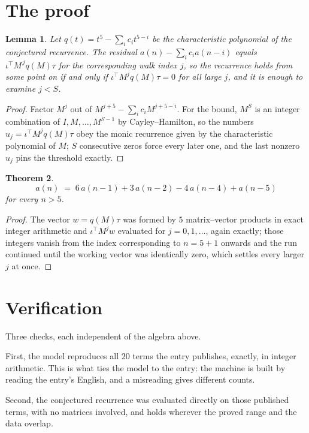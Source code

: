 \documentclass[11pt,a4paper]{article}
\theoremstyle{plain}
\newtheorem{theorem}{Theorem}
\newtheorem{lemma}[theorem]{Lemma}
\theoremstyle{definition}
\begin{document}
\section{The proof}

\begin{lemma}\label{lem:crit}
Let $q(t)=t^{5}-\sum_i c_it^{5-i}$ be the characteristic polynomial of the
conjectured recurrence. The residual $a(n)-\sum_ic_ia(n-i)$ equals
$\iota^{\!\top}M^{\,j}q(M)\tau$ for the corresponding walk index $j$, so the recurrence
holds from some point on if and only if $\iota^{\!\top}M^{j}q(M)\tau=0$ for all large $j$,
and it is enough to examine $j<S$.
\end{lemma}

\begin{proof}
Factor $M^{j}$ out of $M^{j+5}-\sum_ic_iM^{j+5-i}$. For the bound, $M^{S}$
is an integer combination of $I,M,\dots,M^{S-1}$ by Cayley--Hamilton, so the numbers
$u_j=\iota^{\!\top}M^{j}q(M)\tau$ obey the monic recurrence given by the characteristic
polynomial of $M$; $S$ consecutive zeros force every later one, and the last nonzero $u_j$
pins the threshold exactly.
\end{proof}

\begin{theorem}
\[
a(n)\;=\;6\,a(n-1) + 3\,a(n-2) - 4\,a(n-4) + a(n-5)
\]
for every $n>5$.
\end{theorem}

\begin{proof}
The vector $w=q(M)\tau$ was formed by $5$ matrix--vector products in exact integer
arithmetic and $\iota^{\!\top}M^{j}w$ evaluated for $j=0,1,\dots$, again exactly; those
integers vanish from the index corresponding to $n=5+1$ onwards and the run continued
until the working vector was identically zero, which settles every larger $j$ at once.
\end{proof}

\section{Verification}

Three checks, each independent of the algebra above.

First, the model reproduces all $20$ terms the entry publishes, exactly, in integer
arithmetic. This is what ties the model to the entry: the machine is built by reading the
entry's English, and a misreading gives different counts.

Second, the conjectured recurrence was evaluated directly on those published terms, with no
matrices involved, and holds wherever the proved range and the data overlap.
\end{document}
